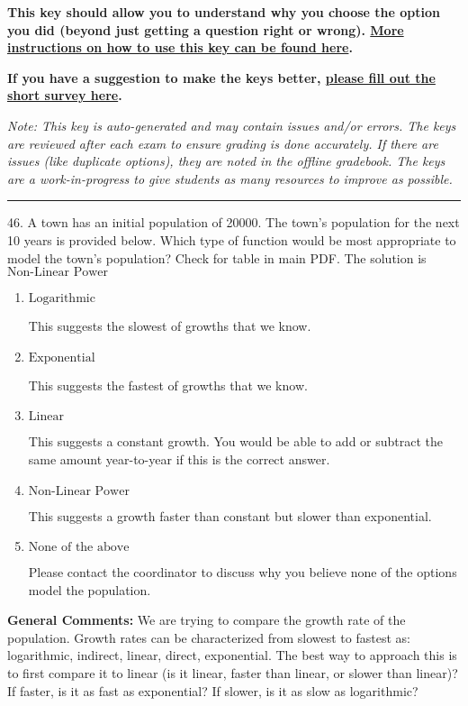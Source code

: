 \documentclass{extbook}[14pt]
\begin{document}
\textbf{This key should allow you to understand why you choose the option you did (beyond just getting a question right or wrong). \href{https://xronos.clas.ufl.edu/mac1105spring2020/courseDescriptionAndMisc/Exams/LearningFromResults}{More instructions on how to use this key can be found here}.}

\textbf{If you have a suggestion to make the keys better, \href{https://forms.gle/CZkbZmPbC9XALEE88}{please fill out the short survey here}.}

\textit{Note: This key is auto-generated and may contain issues and/or errors. The keys are reviewed after each exam to ensure grading is done accurately. If there are issues (like duplicate options), they are noted in the offline gradebook. The keys are a work-in-progress to give students as many resources to improve as possible.}

\rule{\textwidth}{0.4pt}

46. A town has an initial population of 20000. The town's population for the next 10 years is provided below. Which type of function would be most appropriate to model the town's population?
Check for table in main PDF. 
The solution is $ \text{Non-Linear Power} $ 

\begin{enumerate}[label=\Alph*.] 
\item $ \text{Logarithmic} $ 

 This suggests the slowest of growths that we know. 
\item $ \text{Exponential} $ 

 This suggests the fastest of growths that we know. 
\item $ \text{Linear} $ 

 This suggests a constant growth. You would be able to add or subtract the same amount year-to-year if this is the correct answer. 
\item $ \text{Non-Linear Power} $ 

 This suggests a growth faster than constant but slower than exponential. 
\item $ \text{None of the above} $ 

 Please contact the coordinator to discuss why you believe none of the options model the population. 
\end{enumerate} 
 
\textbf{General Comments:} We are trying to compare the growth rate of the population. Growth rates can be characterized from slowest to fastest as: logarithmic, indirect, linear, direct, exponential. The best way to approach this is to first compare it to linear (is it linear, faster than linear, or slower than linear)? If faster, is it as fast as exponential? If slower, is it as slow as logarithmic?
\end{document}
